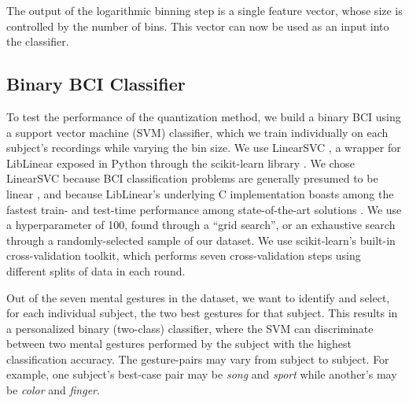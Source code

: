 
The output of the logarithmic binning step is a single feature vector, whose size is controlled by the number of bins. This vector can now be used as an input into the classifier.

\subsection{Binary BCI Classifier}

To test the performance of the quantization method, we build a binary BCI using a support vector machine (SVM) classifier, which we train individually on each subject's recordings while varying the bin size. We use LinearSVC \cite{fan_liblinear:_2008}, a wrapper for LibLinear exposed in Python through the scikit-learn library \cite{pedregosa_scikit-learn:_2011}. We chose LinearSVC because BCI classification problems are generally presumed to be linear  \cite{garrett_comparison_2003,lotte_review_2007}, and because LibLinear's underlying C implementation boasts among the fastest train- and test-time performance among state-of-the-art solutions \cite{fan_liblinear:_2008}. We use a hyperparameter of 100, found through a ``grid search'', or an exhaustive search through a randomly-selected sample of our dataset. 
We use scikit-learn's built-in cross-validation toolkit, which performs seven cross-validation steps using different splits of data in each round.


Out of the seven mental gestures in the dataset, we want to identify and select, for each individual subject, the two best gestures for that subject. This results in a personalized binary (two-class) classifier, where the SVM can discriminate between two mental gestures performed by the subject with the highest classification accuracy. The gesture-pairs may vary from subject to subject. For example, one subject's best-case pair may be \textit{song} and \textit{sport} while another's may be \textit{color} and \textit{finger}.

